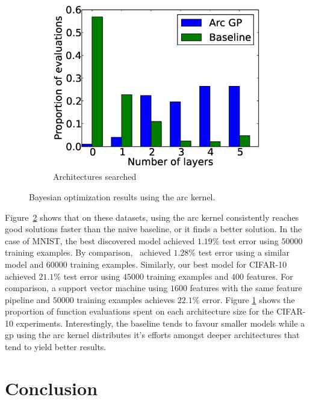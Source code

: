 \documentclass{article}
\newcommand{\gp}{{\sc gp}}
\begin{document}
\begin{figure}[t!]
\begin{subfigure}[]{0.3\textwidth}
		\includegraphics[width=\textwidth]{figures/fevals_per_layer.eps}
		\caption{Architectures searched}
		\label{fig:proparchs}
	\end{subfigure}
	\caption{Bayesian optimization results using the arc kernel.}
	\label{fig:arcbo}
\vspace{-0.3cm}
\end{figure}

Figure~\ref{fig:arcbo} shows that on these datasets, using the arc kernel consistently reaches good solutions faster than the naive baseline, or it finds a better solution. In the case of MNIST, the best discovered model achieved $1.19\%$ test error using $50000$ training examples. By comparison,~\cite{wan2013regularization} achieved $1.28\%$ test error using a similar model and $60000$ training examples. Similarly, our best model for CIFAR-10 achieved $21.1\%$ test error using $45000$ training examples and $400$ features. For comparison, a support vector machine using $1600$ features with the same feature pipeline and $50000$ training examples achieves $22.1\%$ error. Figure \ref{fig:proparchs} shows the proportion of function evaluations spent on each architecture size for the CIFAR-10 experiments. Interestingly, the baseline tends to favour smaller models while a \gp{} using the arc kernel distributes it's efforts amongst deeper architectures that tend to yield better results.

\section{Conclusion}
\vspace{-0.05in} 
\end{document}
